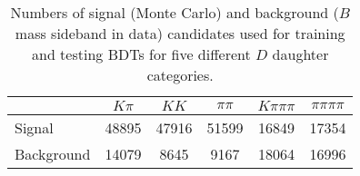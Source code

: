 \begin{table}
  \centering
  \begin{tabular}{lccccc}
      \toprule
      & $K\pi$ & $KK$ & $\pi\pi$ & $K\pi\pi\pi$ & $\pi\pi\pi\pi$ \\
      \midrule
      Signal & 48895 & 47916 & 51599 & 16849 & 17354 \\
      Background & 14079 & 8645 & 9167 & 18064 & 16996 \\
      \bottomrule
  \end{tabular}
  \caption{\small Numbers of signal (Monte Carlo) and background ($B$ mass sideband in data) candidates used for training and testing BDTs for five different $D$ daughter categories.}
\label{tab:BDT_n_events}
\end{table}
